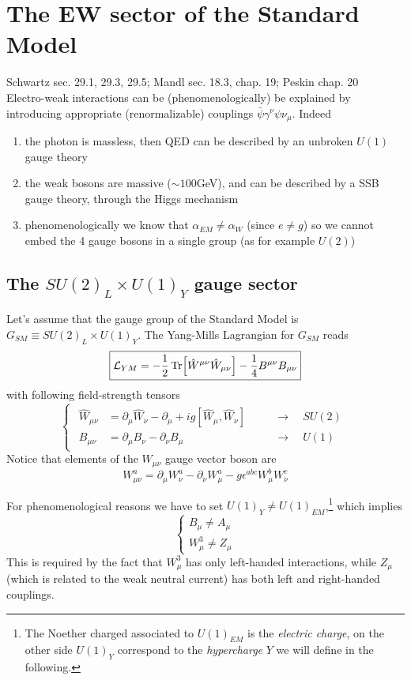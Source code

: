 \documentclass[TheoreticalPhy_ModB.tex]{subfiles}
\begin{document}
\newcommand{\lag}{\mathcal L}
\newcommand{\pde}[1]{\partial_{#1}}
\newcommand{\ipde}[1]{\partial^{#1}}
\newcommand{\mn}{{\mu\nu}}

\chapter{The EW sector of the Standard Model}
\textsf{Schwartz sec. 29.1, 29.3, 29.5; Mandl sec. 18.3, chap. 19; Peskin chap. 20}\\

Electro-weak interactions can be (phenomenologically) be explained by introducing appropriate (renormalizable) couplings $\bar\psi\gamma^\nu\psi\nu_\mu$. Indeed
\begin{enumerate}[label=\textbullet]
\item the photon is massless, then QED can be described by an unbroken $U(1)$ gauge theory
\item the weak bosons are massive ($\sim100$GeV), and can be described by a SSB gauge theory, through the Higgs mechanism
\item phenomenologically we know that $\alpha_{EM}\neq\alpha_W$ (since $e\neq g$) so we cannot embed the 4 gauge bosons in a single group (as for example $U(2)$)
\end{enumerate}

\section{The $SU(2)_L\times U(1)_Y$ gauge sector}

Let's assume that the gauge group of the Standard Model is $\boxed{G_{SM}\equiv SU(2)_L\times U(1)_Y}$. The Yang-Mills Lagrangian for $G_{SM}$ reads
\[\boxed{\lag_{YM}=-\frac12\Tr[\hat W^{\mu\nu}\hat W_{\mu\nu}]-\frac14B^{\mu\nu}B_{\mu\nu}}\]
with following field-strength tensors
\[\begin{cases}\begin{aligned}
\hat W_{\mu\nu}&=\pde\mu\hat W_\nu-\pde\mu+ig\left[\hat W_\mu,\hat W_\nu\right]&&\quad\to\quad SU(2)\\
B_{\mu\nu}&=\pde\mu B_\nu-\pde\nu B_\mu&&\quad\to\quad U(1)
\end{aligned}\end{cases}\]
Notice that elements of the $W_{\mu\nu}$ gauge vector boson are
\[W_{\mu\nu}^a=\pde\mu W_\nu^a-\pde\nu W_\mu^a-g\epsilon^{abc}W_\mu^b W_\nu^c\]

For phenomenological reasons we have to set $U(1)_Y\neq U(1)_{EM}$,\footnote{The Noether charged associated to $U(1)_{EM}$ is the \emph{electric charge}, on the other side $U(1)_Y$ correspond to the \emph{hypercharge} $Y$ we will define in the following. } which implies
\[\begin{cases}
B_\mu\neq A_\mu\\
W_\mu^3\neq Z_\mu
\end{cases}\]
This is required by the fact that $W_\mu^3$ has only left-handed interactions, while $Z_\mu$ (which is related to the weak neutral current) has both left and right-handed couplings.
\end{document}
